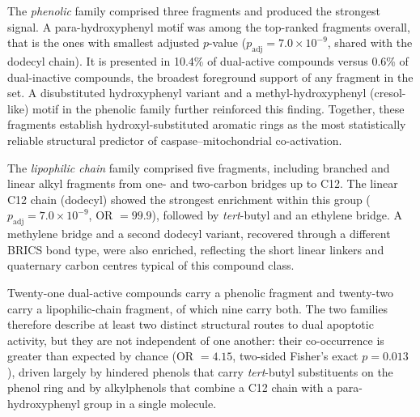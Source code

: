 \documentclass[letterpaper]{article}
\begin{document}
The \emph{phenolic} family comprised three fragments and produced the strongest
signal. A para-hydroxyphenyl motif was among the top-ranked fragments overall, that is the ones with smallest adjusted $p$-value
($p_{\text{adj}} = 7.0 \times 10^{-9}$, shared with the dodecyl chain). It is presented in 10.4\% of
dual-active compounds versus 0.6\% of dual-inactive compounds, the broadest
foreground support of any fragment in the set. A
disubstituted hydroxyphenyl variant and a methyl-hydroxyphenyl (cresol-like)
motif in the phenolic family further
reinforced this finding. Together, these fragments establish
hydroxyl-substituted aromatic rings as the most statistically reliable
structural predictor of caspase--mitochondrial co-activation.

The \emph{lipophilic chain} family comprised five fragments, including branched and
linear alkyl fragments from one- and two-carbon bridges up to C12. The linear C12
chain (dodecyl) showed the strongest enrichment within this
group ($p_{\text{adj}} = 7.0 \times 10^{-9}$, OR $= 99.9$), followed by \textit{tert}-butyl and an ethylene bridge. A methylene bridge and a second dodecyl variant, recovered through a different BRICS bond type, were also enriched, reflecting the short linear linkers and quaternary carbon centres
typical of this compound class.

Twenty-one dual-active compounds carry a phenolic fragment and twenty-two carry a
lipophilic-chain fragment, of which nine carry both. The two families therefore
describe at least two distinct structural routes to dual apoptotic activity, but they
are not independent of one another: their co-occurrence is greater than expected by
chance (OR $= 4.15$, two-sided Fisher's exact $p = 0.013$), driven largely by
hindered phenols that carry \textit{tert}-butyl substituents on the phenol ring and by
alkylphenols that combine a C12 chain with a para-hydroxyphenyl group in a single
molecule.
\end{document}
